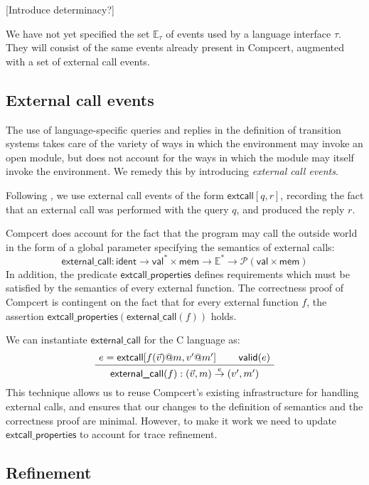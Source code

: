 \documentclass[sigplan,10pt,review,anonymous]{acmart}
\newcommand{\kw}[1]{\ensuremath{ \textsf{#1} }}
\begin{document}
[Introduce determinacy?]

We have not yet specified the set $\mathbb{E}_\tau$ of events
used by a language interface $\tau$.
They will consist of the same events already present in Compcert,
augmented with a set of external call events.


\subsection{External call events} %

The use of language-specific queries and replies
in the definition of transition systems
takes care of the variety of ways
in which the environment may invoke an open module,
but does not account for the ways in which
the module may itself invoke the environment.
We remedy this by introducing \emph{external call events}.

Following \cite{cpp15},
we use external call events of the form $\kw{extcall}[q, r]$,
recording the fact that an external call was performed
with the query $q$,
and produced the reply $r$.

Compcert does account for the fact that the program
may call the outside world in the form of a global parameter
specifying the semantics of external calls:
\[
  \kw{external\_call} :
    \kw{ident} \rightarrow
    \kw{val}^* \times \kw{mem} \rightarrow
    \mathbb{E}^* \rightarrow
    \mathcal{P}(\kw{val} \times \kw{mem})
\]
In addition,
the predicate $\kw{extcall\_properties}$ defines
requirements which must be satisfied by the semantics
of every external function.
The correctness proof of Compcert is contingent
on the fact that for every external function $f$,
the assertion $\kw{extcall\_properties}(\kw{external\_call}(f))$ holds.

We can instantiate $\kw{external\_call}$ for the C language as:
\[
  \AxiomC{$e = \kw{extcall}[f(\vec{v})@m, v'@m']$}
  \AxiomC{$\kw{valid}(e)$}
  \BinaryInfC{$\kw{external\_call}(f) :
    (\vec{v}, m) \stackrel{e}{\rightarrow} (v', m')$}
  \DisplayProof
\]
This technique allows us to reuse Compcert's existing infrastructure
for handling external calls,
and ensures that our changes to the
definition of semantics and the correctness proof are minimal.
However,
to make it work we need to update $\kw{extcall\_properties}$
to account for trace refinement.


\subsection{Refinement} %
\end{document}
